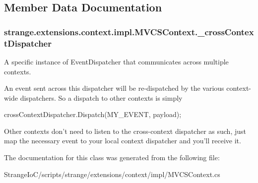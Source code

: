 \subsection{Member Data Documentation}
\hypertarget{classstrange_1_1extensions_1_1context_1_1impl_1_1_m_v_c_s_context_a55fc4efce14c8f9021cba2e25851942b}{
\subsubsection[{\-\_\-cross\-Context\-Dispatcher}]{ strange.\-extensions.\-context.\-impl.\-M\-V\-C\-S\-Context.\-\_\-cross\-Context\-Dispatcher\hspace{0.3cm}{\ttfamily [protected]}}}\label{classstrange_1_1extensions_1_1context_1_1impl_1_1_m_v_c_s_context_a55fc4efce14c8f9021cba2e25851942b}


A specific instance of Event\-Dispatcher that communicates across multiple contexts. 

An event sent across this dispatcher will be re-\/dispatched by the various context-\/wide dispatchers. So a dispatch to other contexts is simply

{\ttfamily cross\-Context\-Dispatcher.\-Dispatch(\-M\-Y\-\_\-\-E\-V\-E\-N\-T, payload)};

Other contexts don't need to listen to the cross-\/context dispatcher as such, just map the necessary event to your local context dispatcher and you'll receive it. 

The documentation for this class was generated from the following file\-:\begin{DoxyCompactItemize}
\item 
Strange\-Io\-C/scripts/strange/extensions/context/impl/M\-V\-C\-S\-Context.\-cs\end{DoxyCompactItemize}
